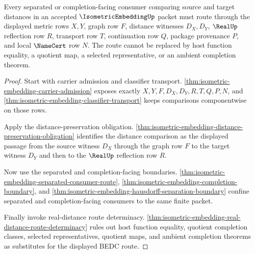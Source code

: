 \begin{theorem}
\label{thm:isometric-embedding-distance-route-reflection-lock}
Every separated or completion-facing consumer comparing source and target distances in an accepted $\IsometricEmbeddingUp$ packet must route through the displayed metric rows $X,Y$, graph row $F$, distance witnesses $D_X,D_Y$, $\RealUp$ reflection row $R$, transport row $T$, continuation row $Q$, package provenance $P$, and local $\NameCert$ row $N$. The route cannot be replaced by host function equality, a quotient map, a selected representative, or an ambient completion theorem.
\end{theorem}
\begin{proof}
Start with carrier admission and classifier transport. \autoref{thm:isometric-embedding-carrier-admission} exposes exactly $X,Y,F,D_X,D_Y,R,T,Q,P,N$, and \autoref{thm:isometric-embedding-classifier-transport} keeps comparisons componentwise on those rows.

Apply the distance-preservation obligation. \autoref{thm:isometric-embedding-distance-preservation-obligation} identifies the distance comparison as the displayed passage from the source witness $D_X$ through the graph row $F$ to the target witness $D_Y$ and then to the $\RealUp$ reflection row $R$.

Now use the separated and completion-facing boundaries. \autoref{thm:isometric-embedding-separated-consumer-route}, \autoref{thm:isometric-embedding-completion-boundary}, and \autoref{thm:isometric-embedding-hausdorff-separation-boundary} confine separated and completion-facing consumers to the same finite packet.

Finally invoke real-distance route determinacy. \autoref{thm:isometric-embedding-real-distance-route-determinacy} rules out host function equality, quotient completion classes, selected representatives, quotient maps, and ambient completion theorems as substitutes for the displayed BEDC route.
\end{proof}

